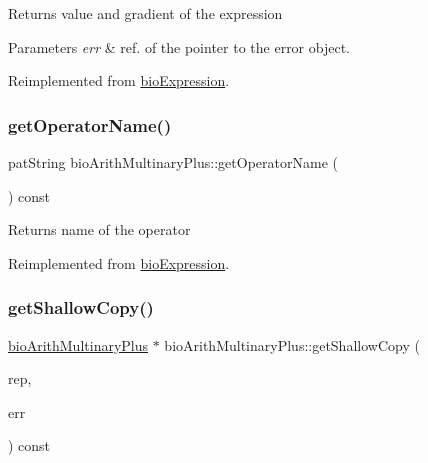 \begin{DoxyReturn}{Returns}
value and gradient of the expression 
\end{DoxyReturn}

\begin{DoxyParams}{Parameters}
{\em err} & ref. of the pointer to the error object. \\
\hline
\end{DoxyParams}


Reimplemented from \hyperlink{classbio_expression_a91c81ce80c9e972c913b10f5f3c1ed13}{bio\+Expression}.

\mbox{\label{classbio_arith_multinary_plus_ac43848551e8c792e9776b7a5e8aef51b}} 
\subsubsection{\texorpdfstring{get\+Operator\+Name()}{getOperatorName()}}
{\footnotesize\ttfamily pat\+String bio\+Arith\+Multinary\+Plus\+::get\+Operator\+Name (\begin{DoxyParamCaption}{ }\end{DoxyParamCaption}) const\hspace{0.3cm}{\ttfamily [virtual]}}

\begin{DoxyReturn}{Returns}
name of the operator 
\end{DoxyReturn}


Reimplemented from \hyperlink{classbio_expression_a2353a4afb3a2b0af7c63aba086a72bde}{bio\+Expression}.

\mbox{\label{classbio_arith_multinary_plus_a026a46872ed07e51b2a337f45b5086ad}} 
\subsubsection{\texorpdfstring{get\+Shallow\+Copy()}{getShallowCopy()}}
{\footnotesize\ttfamily \hyperlink{classbio_arith_multinary_plus}{bio\+Arith\+Multinary\+Plus} $\ast$ bio\+Arith\+Multinary\+Plus\+::get\+Shallow\+Copy (\begin{DoxyParamCaption}\item[{\hyperlink{classbio_expression_repository}{bio\+Expression\+Repository} $\ast$}]{rep,  }\item[{pat\+Error $\ast$\&}]{err }\end{DoxyParamCaption}) const\hspace{0.3cm}{\ttfamily [virtual]}}

